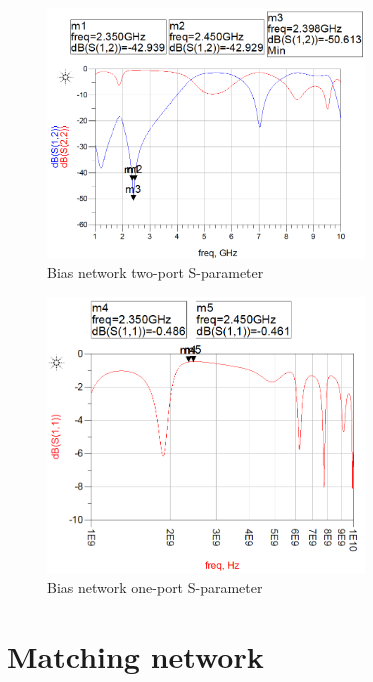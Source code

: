   \begin{figure}[h]
	  \label{fig:Biastwos}
	  \centering
	  \includegraphics[width=0.75\textwidth]{img/Bias_filter_two_port_s_parm}
	  \caption{Bias network two-port S-parameter}
  \end{figure}

  \begin{figure}[h]
	  \label{fig:Biasones}
	  \centering
	  \includegraphics[width=0.75\textwidth]{img/Bias_filter_one_port_s_parm}
	  \caption{Bias network one-port S-parameter}
  \end{figure}

  \section{Matching network}

